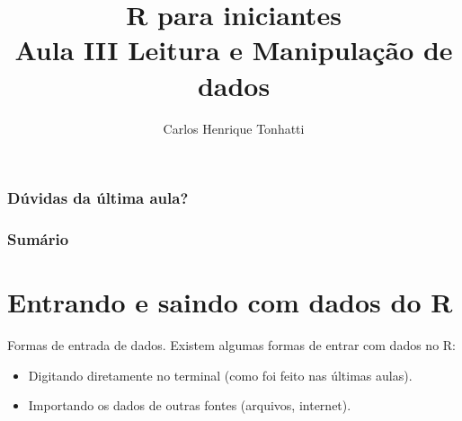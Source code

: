 \documentclass{beamer}
\title[Linguagem R]{R para iniciantes\\ Aula III Leitura e Manipulação de dados}
\author {Carlos Henrique Tonhatti}
\date{}
\begin{document}
\frame{\titlepage} %

\begin{frame}
  \frametitle{Dúvidas da última aula?}
\end{frame}

\begin{frame}
 \frametitle{Sumário}
 \tableofcontents[pausesections]
  \setcounter{tocdepth}{2}%
\end{frame}



\section{Entrando  e saindo com dados do R}
\begin{frame}{Formas de entrada de dados.}
\centering
   Existem algumas formas de entrar com dados no R: \vspace{10pt}
   \begin{itemize}
   \item Digitando diretamente no terminal (como foi feito nas últimas aulas).
   \item Importando os dados de outras fontes (arquivos, internet).
   \end{itemize}
  \end{frame}
\end{document}
